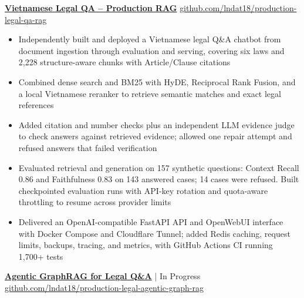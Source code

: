 \documentclass[10pt]{article}
\begin{document}
\href{https://github.com/lndat18/production-legal-qa-rag}{\textbf{Vietnamese Legal QA -- Production RAG}}
\hfill \href{https://github.com/lndat18/production-legal-qa-rag}{github.com/lndat18/production-legal-qa-rag}

\vspace{2pt}

\begin{itemize}[topsep=0pt, itemsep=2pt]
    \item Independently built and deployed a Vietnamese legal Q\&A chatbot from document ingestion through evaluation and serving, covering six laws and 2,228 structure-aware chunks with Article/Clause citations
    \item Combined dense search and BM25 with HyDE, Reciprocal Rank Fusion, and a local Vietnamese reranker to retrieve semantic matches and exact legal references
    \item Added citation and number checks plus an independent LLM evidence judge to check answers against retrieved evidence; allowed one repair attempt and refused answers that failed verification
    \item Evaluated retrieval and generation on 157 synthetic questions: Context Recall 0.86 and Faithfulness 0.83 on 143 answered cases; 14 cases were refused. Built checkpointed evaluation runs with API-key rotation and quota-aware throttling to resume across provider limits
    \item Delivered an OpenAI-compatible FastAPI API and OpenWebUI interface with Docker Compose and Cloudflare Tunnel; added Redis caching, request limits, backups, tracing, and metrics, with GitHub Actions CI running 1,700+ tests
\end{itemize}

\vspace{3pt}

\href{https://github.com/lndat18/production-legal-agentic-graph-rag}{\textbf{Agentic GraphRAG for Legal Q\&A}} \;|\; In Progress
\hfill \href{https://github.com/lndat18/production-legal-agentic-graph-rag}{github.com/lndat18/production-legal-agentic-graph-rag}

\vspace{2pt}
\end{document}
